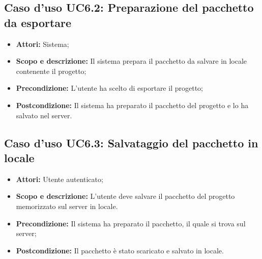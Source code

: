 \subsection{Caso d'uso UC6.2: Preparazione del pacchetto da esportare}
	\begin{itemize}
		\item \textbf{Attori:} Sistema;
		\item \textbf{Scopo e descrizione:} Il sistema prepara il pacchetto da salvare in locale contenente il progetto;
		\item \textbf{Precondizione:} L'utente ha scelto di esportare il progetto;
		\item \textbf{Postcondizione:} Il sistema ha preparato il pacchetto del progetto e lo ha salvato nel server.
	\end{itemize}


\subsection{Caso d'uso UC6.3: Salvataggio del pacchetto in locale}
	\begin{itemize}
		\item \textbf{Attori:} Utente autenticato;
		\item \textbf{Scopo e descrizione:} L'utente deve salvare il pacchetto del progetto memorizzato sul server in locale.
		\item \textbf{Precondizione:} Il sistema ha preparato il pacchetto, il quale si trova sul server;
		\item \textbf{Postcondizione:} Il pacchetto è stato scaricato e salvato in locale.
	\end{itemize}